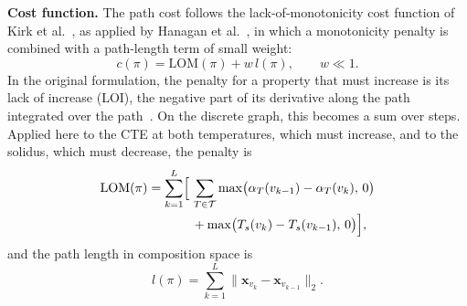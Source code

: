 \textbf{Cost function.} The path cost follows the lack-of-monotonicity cost function
of Kirk et al.~\cite{kirk2021monotonic}, as applied by Hanagan
et al.~\cite{hanagan2025sfe}, in which a monotonicity penalty is combined with a
path-length term of small weight:
\begin{equation}
c(\pi) = \mathrm{LOM}(\pi) + w\,l(\pi), \qquad w \ll 1.
\label{eq:cost}
\end{equation}
In the original formulation, the penalty for a property that must increase is its
lack of increase (LOI), the negative part of its derivative along the path
integrated over the path~\cite{hanagan2025sfe}. On the discrete graph, this becomes a
sum over steps. Applied here to the CTE at both temperatures, which must increase,
and to the solidus, which must decrease, the penalty is
\begin{equation}
\begin{split}
\mathrm{LOM}(\pi) = \sum_{k=1}^{L} \Bigl[\,
  & \sum_{T\in\mathcal{T}} \max\bigl(\alpha_T(v_{k-1})-\alpha_T(v_k),\,0\bigr)\\
  & + \max\bigl(T_s(v_k)-T_s(v_{k-1}),\,0\bigr) \Bigr],
\end{split}
\label{eq:loi}
\end{equation}
and the path length in composition space is
\begin{equation}
l(\pi)=\sum_{k=1}^{L}\bigl\lVert \mathbf{x}_{v_k}-\mathbf{x}_{v_{k-1}}\bigr\rVert_2 .
\label{eq:length}
\end{equation}

